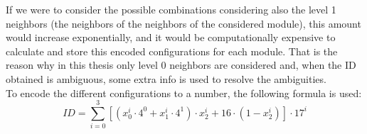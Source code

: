 If we were to consider the possible combinations considering also the level 1 neighbors (the neighbors of the neighbors of the considered module), this amount would increase exponentially, and it would be computationally expensive to calculate and store this encoded configurations for each module. That is the reason why in this thesis only level 0 neighbors are considered and, when the ID obtained is ambiguous, some extra info is used to resolve the ambiguities.\\

To encode the different configurations to a number, the following formula is used:
\begin{equation} \label{eq:ID_calculation}
ID = \sum_{i=0}^{3}{ [( x_0^i \cdot 4^0+ x_1^i \cdot 4^1) \cdot x_2^i + 16 \cdot (1-x_2^i)] \cdot 17^i}
\end{equation}

